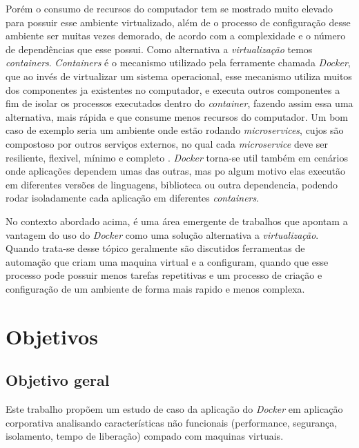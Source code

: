 \documentclass[11pt,a4paper]{article}
\begin{document}
Porém o consumo de recursos do computador tem se mostrado muito elevado para possuir esse ambiente virtualizado,
além de o processo de configuração desse ambiente ser muitas vezes demorado, de acordo com a complexidade e
o número de dependências que esse possui. Como alternativa a \textit{virtualização} temos \textit{containers}.
\textit{Containers} é o mecanismo utilizado pela ferramente chamada \textit{Docker}, que ao invés de virtualizar
um sistema operacional, esse mecanismo utiliza muitos dos componentes ja existentes no computador, e executa
outros componentes a fim de isolar os processos executados dentro do \textit{container}\cite{TW_docker_for_builds},
fazendo assim essa uma alternativa, mais rápida e que consume menos recursos do computador\cite{DZone_CD_guide_v3}.
Um bom caso de exemplo seria um ambiente onde estão rodando \textit{microservices}, cujos são compostoso por
outros serviços externos, no qual cada \textit{microservice} deve ser resiliente, flexivel, mínimo e completo
\cite{Bugwadia_arch_constrains}. \textit{Docker} torna-se util também em cenários onde aplicações dependem umas
das outras, mas po algum motivo elas executão em diferentes versões de linguagens, biblioteca ou outra dependencia,
podendo rodar isoladamente cada aplicação em diferentes \textit{containers}\cite{Merkel_Docker}.

No contexto abordado acima, é uma área emergente de trabalhos que apontam a vantagem do uso do \textit{Docker} como uma solução
alternativa a \textit{virtualização}\cite{Jafari_infra_as_a_code}. Quando trata-se desse tópico geralmente são
discutidos ferramentas de automação que criam uma maquina virtual e a configuram, quando que esse processo
pode possuir menos tarefas repetitivas e um processo de criação e configuração de um ambiente de forma mais
rapido e menos complexa.

\section{Objetivos}\label{sec:objetivos}

\subsection{Objetivo geral}

Este trabalho propõem um estudo de caso da aplicação do \textit{Docker} em aplicação corporativa analisando características
não funcionais (performance, segurança, isolamento, tempo de liberação) compado com maquinas virtuais.
\end{document}
